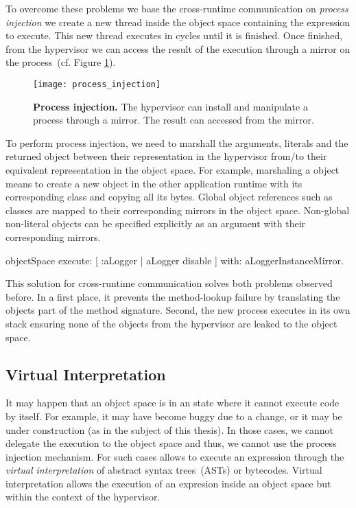 To overcome these problems we base the cross-runtime communication on \emph{process injection} \ie we create a new thread inside the object space containing the expression to execute. This new thread executes in cycles until it is finished. Once finished, from the hypervisor we can access the result of the execution through a mirror on the process~(cf. Figure \ref{fig:process_injection}).

\begin{figure}[ht]
\center
\texttt{[image: process\_injection]}
\caption{\textbf{Process injection.} The hypervisor can install and manipulate a process through a mirror. The result can accessed from the mirror.\label{fig:process_injection}}
\end{figure}

To perform process injection, we need to marshall the arguments, literals and the returned object between their representation in the hypervisor from/to their equivalent representation in the object space. For example, marshaling a  object means to create a new  object in the other application runtime with its corresponding class and copying all its bytes. Global object references such as classes are mapped to their corresponding mirrors in the object space. Non-global non-literal objects can be specified explicitly as an argument with their corresponding mirrors.

\begin{code}
objectSpace
	execute: [ :aLogger | aLogger disable ]
	with: aLoggerInstanceMirror.
\end{code}

This solution for cross-runtime communication solves both problems observed before. In a first place, it prevents the method-lookup failure by translating the objects part of the method signature. Second, the new process executes in its own stack ensuring none of the objects from the hypervisor are leaked to the object space.

\subsection{Virtual Interpretation} \label{sec:interpretation}

It may happen that an object space is in an state where it cannot execute code by itself. For example, it may have become buggy due to a change, or it may be under construction (as in the subject of this thesis). In those cases, we cannot delegate the execution to the object space and thus, we cannot use the process injection mechanism.  For such cases \Vtt allows to execute an expression through the \emph{virtual interpretation} of \eg abstract syntax trees~(ASTs) or bytecodes. Virtual interpretation allows the execution of an expresion inside an object space but within the context of the hypervisor.

